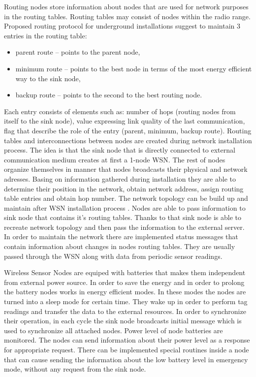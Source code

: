 \documentclass[../main.tex]{subfiles}
\begin{document}
Routing nodes store information about nodes that are used for network purposes in the routing tables. Routing tables may consist of nodes within the radio range. Proposed routing protocol for underground installations suggest to maintain 3 entries in the routing table\cite{WSN_monitoring}:

\begin{itemize}
	\item parent route -- points to the parent node,
	\item minimum route -- points to the best node in terms of the most energy efficient way to the sink node,
	\item backup route -- points to the second to the best routing node.
\end{itemize}

Each entry consists of elements such as: number of hops (routing nodes from itself to the sink node), value expressing link quality of the last communication, flag that describe the role of the entry (parent, minimum, backup route). Routing tables and interconnections between nodes are created during network installation process. The idea is that the sink node that is directly connected to external communication medium creates at first a 1-node WSN. The rest of nodes organize themselves in manner that nodes broadcasts their physical and network adresses. Basing on information gathered during installation they are able to determine their position in the network, obtain network address, assign routing table entries and obtain hop number. The network topology can be build up and maintain after WSN installation process \cite{ZigBee_applications}. Nodes are able to pass information to sink node that contains it's routing tables. Thanks to that sink node is able to recreate network topology and then pass the information to the external server. In order to maintain the network there are implemented status messages that contain information about changes in nodes routing tables. They are usually passed through the WSN along with data from periodic sensor readings.

Wireless Sensor Nodes are equiped with batteries that makes them independent from external power source. In order to save the energy and in order to prolong the battery nodes works in energy efficient modes. In these modes the nodes are turned into a sleep mode for certain time. They wake up in order to perform tag readings and transfer the data to the external resources. In order to synchronize their operation, in each cycle the sink node broadcasts initial message which is used to synchronize all attached nodes. Power level of node batteries are monitored. The nodes can send information about their power level as a response for appropriate request. There can be implemented special routines inside a node that can cause sending the information about the low battery level in emergency mode, without any request from the sink node.
\end{document}
